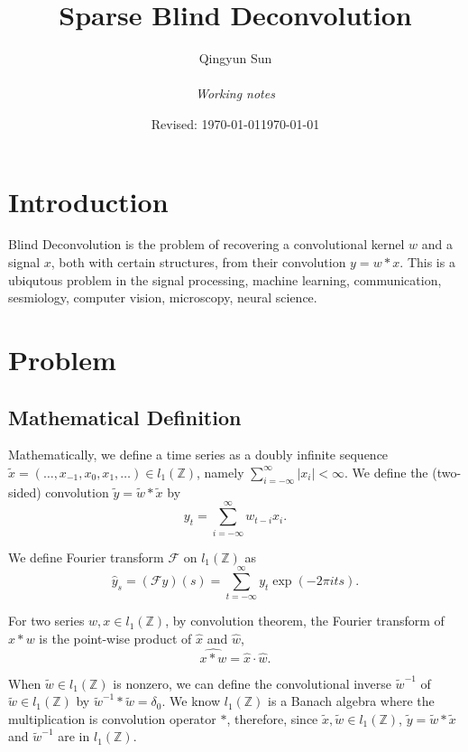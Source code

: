 \documentclass[letter, 10pt]{article}
\title{Sparse Blind Deconvolution}
\author{Qingyun Sun\\
  \vspace{-.1cm}\\
   \emph{Working notes}
}
\date{  \quad Revised: \today}
\date{\today}
\numberwithin{equation}{section}
\begin{document}
\maketitle

\vspace{-0.3in}

\section{Introduction}
Blind Deconvolution is the problem of recovering a convolutional kernel $w$ and a signal $x$, both with certain structures, from their convolution $y=w*x$. This is a ubiqutous problem in the signal processing, machine learning, communication, sesmiology, computer vision, microscopy, neural science. 

 
\section{Problem}
\subsection{Mathematical Definition}
Mathematically, we define a time series as a doubly infinite sequence $\tilde x=(\ldots, x_{-1}, x_0, x_1, \ldots)\in l_1( \mathbb{Z})$,  namely $\sum_{i=-\infty}^{\infty}|x_i| < \infty$. 
We define the (two-sided) convolution 
$\tilde y=\tilde w*\tilde x$ by 
$$y_t = \sum_{i=-\infty}^{\infty}w_{t-i}x_i.$$

We define Fourier transform $\mathcal F$ on $l_1( \mathbb{Z})$
as $$ \hat y_s = (\mathcal F y)(s) = \sum_{t =-\infty}^\infty y_t 
    \exp \left( -2\pi i ts \right).$$

For two series $w, x \in l_1( \mathbb{Z})$, by convolution theorem, the Fourier transform of $x*w$ is the point-wise product of $\hat x$ and $\hat w$,
$$ \widehat{x*w} = \hat x \cdot \hat w.$$

When $\tilde w \in l_1( \mathbb{Z})$ is nonzero, we can define the convolutional inverse $\tilde w^{-1}$ of $\tilde w\in l_1( \mathbb{Z})$ by $\tilde w^{-1}*\tilde w = \delta_0$.
 We know $l_1( \mathbb{Z})$ is a Banach algebra where the multiplication is convolution operator $*$, therefore, since $\tilde x,\tilde w\in l_1( \mathbb{Z})$, $\tilde y=\tilde w*\tilde x$ and $\tilde w^{-1}$ are in $l_1( \mathbb{Z})$.
  
\end{document}
